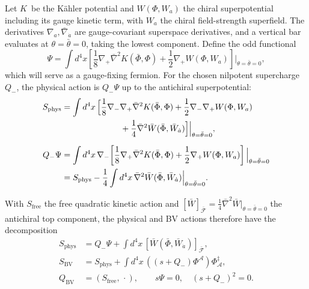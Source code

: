 \documentclass[11pt]{article}
\numberwithin{equation}{section}
\numberwithin{figure}{section}
\numberwithin{table}{section}
\begin{document}
Let $K$~be the K\"ahler potential and $W(\Phi,W_a)$ the chiral superpotential including its gauge kinetic term, with $W_a$ the chiral field-strength superfield. The derivatives $\nabla_a,\bar\nabla_{\dot a}$ are gauge-covariant superspace derivatives, and a vertical bar evaluates at $\theta=\bar\theta=0$, taking the lowest component. Define the odd functional
\begin{equation}\label{eq-Psi}
\Psi=\int d^4x\left[\frac18\nabla_+\bar\nabla^2K(\bar\Phi,\Phi)
+\frac12\nabla_+W(\Phi,W_a)\right]\Big|_{\theta=\bar\theta=0},
\end{equation}
which will serve as a gauge-fixing fermion. For the chosen nilpotent supercharge $Q_-$, the physical action is $Q_-\Psi$ up to the antichiral superpotential:
\begin{equation*}
\begin{aligned}
S_{\mathrm{phys}}
&=\int d^4x\,\Bigl[
\frac18\nabla_-\nabla_+\bar\nabla^2K(\bar\Phi,\Phi)
+\frac12\nabla_-\nabla_+W(\Phi,W_a)\\
&\hspace{7em}+\frac14\bar\nabla^2\bar W(\bar\Phi,\bar W_{\dot a})
\Bigr]\Big|_{\theta=\bar\theta=0},\\[6pt]
Q_-\Psi
&=\int d^4x\,\nabla_-\!\left[
\frac18\nabla_+\bar\nabla^2K(\bar\Phi,\Phi)
+\frac12\nabla_+W(\Phi,W_a)
\right]\Big|_{\theta=\bar\theta=0}\\
&=S_{\mathrm{phys}}-\frac14\int d^4x\,
\bar\nabla^2\bar W(\bar\Phi,\bar W_{\dot a})\Big|_{\theta=\bar\theta=0}.
\end{aligned}
\end{equation*}

With $S_{\mathrm{free}}$ the free quadratic kinetic action and $[\bar W]_{\bar{\mathcal F}}=\tfrac14\bar\nabla^2\bar W|_{\theta=\bar\theta=0}$ the antichiral top component, the physical and BV actions therefore have the decomposition
\begin{equation}\label{eq-B-1}
\begin{aligned}
S_{\mathrm{phys}}
&=Q_-\Psi+\int d^4x\,[\bar W(\bar\Phi,\bar W_{\dot a})]_{\bar{\mathcal F}},\\
S_{\mathrm{BV}}
&=S_{\mathrm{phys}}+\int d^4x\,((s+Q_-)\Phi^{\mathcal A})\Phi_{\mathcal A}^{\ddagger},\\
Q_{\mathrm{BV}}&=(S_{\mathrm{free}},\,\cdot),\qquad
{s\Psi=0,\quad(s+Q_-)^2=0}.
\end{aligned}
\end{equation}
\end{document}
